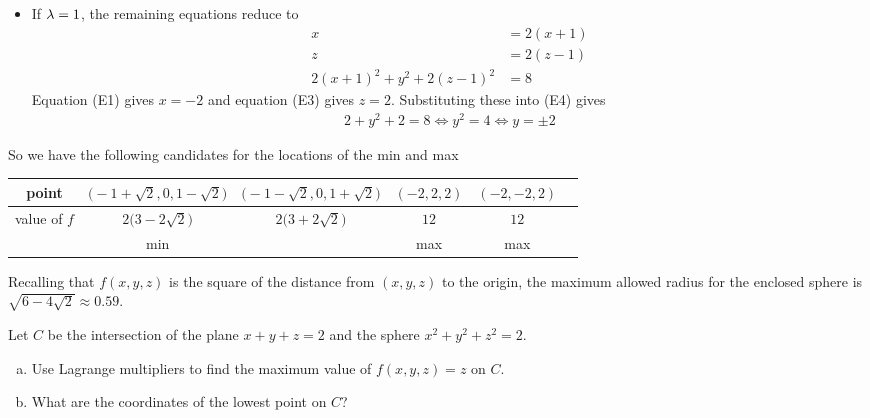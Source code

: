 \begin{solution}
\begin{itemize}
\item
If $\lambda=1$, the remaining equations reduce to
\begin{align*}
x &=2  (x+1)  \tag{E1} \\ 
z &=2  (z-1) \tag{E3} \\ 
2(x+1)^2 + y^2 + 2(z-1)^2 &= 8 \tag{E4}
\end{align*}
Equation (E1) gives $x=-2$ and equation (E3) gives $z=2$.
Substituting these into (E4) gives
\begin{align*}
2+y^2+2=8
\iff y^2=4
\iff y=\pm 2
\end{align*}
\end{itemize}


So we have the following candidates for the locations of the min and max
\begin{center}
\renewcommand{\arraystretch}{1.3}
     \begin{tabular}{|c|c|c|c|c|c|}
     \hline
       point
       &$\big(-1 + \sqrt{2}, 0, 1-\sqrt{2}\big)$
       &$\big(-1 - \sqrt{2}, 0, 1+\sqrt{2}\big)$
       &$(-2,2,2)$
       &$(-2,-2,2) $ \\ \hline
       value of $f$
       &$2\big(3-2\sqrt{2}\big)$
       &$2\big(3+2\sqrt{2}\big)$
       &$12$
       &$12$ \\ \hline
       &min
       & 
       &max 
       &max \\ \hline
     \end{tabular}
\renewcommand{\arraystretch}{1.0}
\end{center}
Recalling that $f(x,y,z)$ is the square of the distance from $(x,y,z)$
to the origin, the maximum allowed radius for the enclosed sphere is
$\sqrt{6-4\sqrt{2}}\approx 0.59$.
\end{solution}

\begin{question}[M200 2012a] %
Let $C$ be the intersection of the plane $x + y + z = 2$ and the sphere 
$x^2 + y^2 + z^2 = 2$.
\begin{enumerate}[(a)]
\item
Use Lagrange multipliers to find the maximum value of $f(x, y, z) = z$ on $C$.
\item
What are the coordinates of the lowest point on $C$?
\end{enumerate}
\end{question}

%

